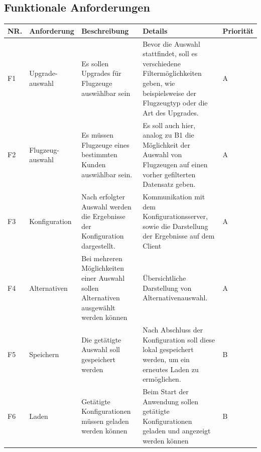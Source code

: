 \subsection{Funktionale Anforderungen}
\begin{tabular}[H]{| p{0.4cm} | p{2.3cm} | p{4.5cm} | p{5.3cm} | p{1.3cm} |}
\toprule[2pt] \rowcolor{dunkelgrau}
\hline
  NR. & Anforderung & Beschreibung & Details & Priorität \\
  \hline
  F1 & Upgrade-auswahl & Es sollen Upgrades für Flugzeuge auswählbar sein & Bevor die Auswahl stattfindet, soll es verschiedene Filtermöglichkeiten geben, wie beispielsweise der Flugzeugtyp oder die Art des Upgrades.
   & A \\
  \hline
  F2 & Flugzeug-auswahl & Es müssen Flugzeuge eines bestimmten Kunden auswählbar sein. & Es soll auch hier, analog zu B1 die Möglichkeit der Auswahl von Flugzeugen auf einen vorher gefilterten Datensatz geben. & A \\
  \hline
    F3 & Konfiguration & Nach erfolgter Auswahl werden die Ergebnisse der Konfiguration dargestellt. & Kommunikation mit dem Konfigurationsserver, sowie die Darstellung der Ergebnisse auf dem Client& A \\
    \hline
     F4 & Alternativen & Bei mehreren Möglichkeiten einer Auswahl sollen Alternativen ausgewählt werden können & Übersichtliche Darstellung von Alternativenauswahl.& A \\
        \hline
    F5 & Speichern & Die getätigte Auswahl soll gespeichert werden& Nach Abschluss der Konfiguration soll diese lokal gespeichert werden, um ein erneutes Laden zu ermöglichen. & B\\
    \hline
    F6 & Laden & Getätigte Konfigurationen müssen geladen werden können& Beim Start der Anwendung sollen getätigte Konfigurationen geladen und angezeigt werden können & B\\
    \hline
\bottomrule[2pt]
\end{tabular}





